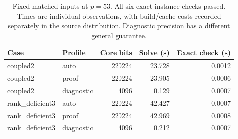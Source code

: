 \begin{table}[ht]
\centering
\begin{tabular}{llrrr}\toprule
Case & Profile & Core bits & Solve (s) & Exact check (s)\\\midrule
coupled2 & auto & 220224 & 23.728 & 0.0012\\
coupled2 & proof & 220224 & 23.905 & 0.0006\\
coupled2 & diagnostic & 4096 & 0.129 & 0.0007\\
rank\_deficient3 & auto & 220224 & 42.427 & 0.0007\\
rank\_deficient3 & proof & 220224 & 42.969 & 0.0008\\
rank\_deficient3 & diagnostic & 4096 & 0.212 & 0.0007\\
\bottomrule\end{tabular}
\caption{Fixed matched inputs at $p=53$. All six exact instance checks passed. Times are individual observations, with build/cache costs recorded separately in the source distribution. Diagnostic precision has a different general guarantee.}
\label{tab:cases}
\end{table}
